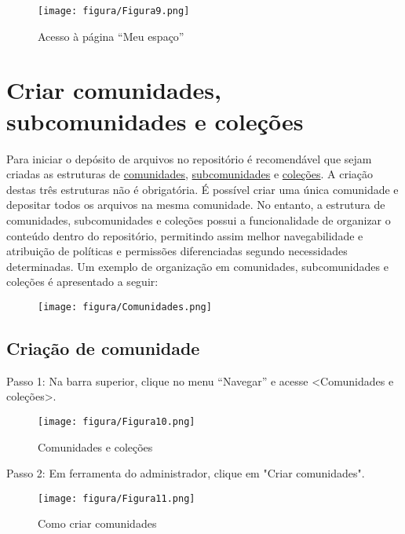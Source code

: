 \documentclass[12pt,hidelinks]{article}
\begin{document}
        \begin{figure}[!htp]
                \centering
                \texttt{[image: figura/Figura9.png]}
                \caption{Acesso à página “Meu espaço”}
            \label{Rotulo}
        \end{figure}
        
        
\newpage        
\section{Criar comunidades, subcomunidades e coleções}
\newpage

    Para iniciar o depósito de arquivos no repositório é recomendável que sejam criadas as
    estruturas de \underline{comunidades}, \underline{subcomunidades} e \underline{coleções}. 
    \singlespacing
    A criação destas três estruturas não é obrigatória. É possível criar uma única comunidade e depositar todos os arquivos na mesma comunidade. No entanto, a estrutura de comunidades, subcomunidades e coleções possui a funcionalidade de organizar o conteúdo dentro do repositório, permitindo assim melhor navegabilidade e atribuição de políticas e permissões diferenciadas segundo necessidades determinadas. Um exemplo de organização em comunidades, subcomunidades e coleções é apresentado a seguir:
    
    \begin{figure}[!htp]
                \centering
                \texttt{[image: figura/Comunidades.png]}
            \label{Rotulo}
        \end{figure}
    
        \subsection{Criação de comunidade}
        
        Passo 1: Na barra superior, clique no menu “Navegar” e acesse <Comunidades e coleções>. 
        
        \begin{figure}[!htp]
                \centering
                \texttt{[image: figura/Figura10.png]}
                \caption{Comunidades e coleções}
            \label{Rotulo}
        \end{figure}
    
\newpage
     Passo 2: Em ferramenta do administrador, clique em "Criar comunidades". 
     
     \begin{figure}[!htp]
                \centering
                \texttt{[image: figura/Figura11.png]}
                \caption{Como criar comunidades}
            \label{Rotulo}
        \end{figure}
        
\end{document}
